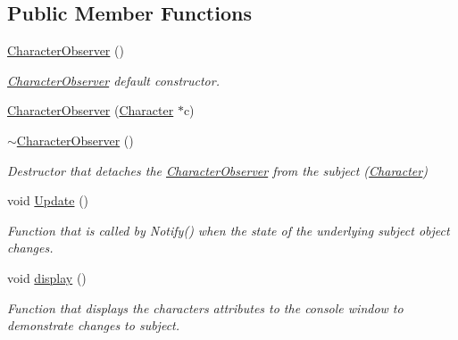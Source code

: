 \subsection*{Public Member Functions}
\begin{DoxyCompactItemize}
\item 
\hypertarget{class_character_observer_a254ed3594bea4060cebb8f00dcf313b0}{}\label{class_character_observer_a254ed3594bea4060cebb8f00dcf313b0} 
\hyperlink{class_character_observer_a254ed3594bea4060cebb8f00dcf313b0}{Character\+Observer} ()
\begin{DoxyCompactList}\small\item\em \hyperlink{class_character_observer}{Character\+Observer} default constructor. \end{DoxyCompactList}\item 
\hyperlink{class_character_observer_a6a215cb4cdb72aabc0ad95b8b7c0373c}{Character\+Observer} (\hyperlink{class_character}{Character} $\ast$c)
\item 
\hypertarget{class_character_observer_ac535a0d01c7ab57f41b933a9507116fb}{}\label{class_character_observer_ac535a0d01c7ab57f41b933a9507116fb} 
\hyperlink{class_character_observer_ac535a0d01c7ab57f41b933a9507116fb}{$\sim$\+Character\+Observer} ()
\begin{DoxyCompactList}\small\item\em Destructor that detaches the \hyperlink{class_character_observer}{Character\+Observer} from the subject (\hyperlink{class_character}{Character}) \end{DoxyCompactList}\item 
\hypertarget{class_character_observer_a398d6d784065c7ed36c928d44a574630}{}\label{class_character_observer_a398d6d784065c7ed36c928d44a574630} 
void \hyperlink{class_character_observer_a398d6d784065c7ed36c928d44a574630}{Update} ()
\begin{DoxyCompactList}\small\item\em Function that is called by Notify() when the state of the underlying subject object changes. \end{DoxyCompactList}\item 
\hypertarget{class_character_observer_af255a3fd431b55de8dd2ab9a639e546b}{}\label{class_character_observer_af255a3fd431b55de8dd2ab9a639e546b} 
void \hyperlink{class_character_observer_af255a3fd431b55de8dd2ab9a639e546b}{display} ()
\begin{DoxyCompactList}\small\item\em Function that displays the character\textquotesingle{}s attributes to the console window to demonstrate changes to subject. \end{DoxyCompactList}\end{DoxyCompactItemize}
